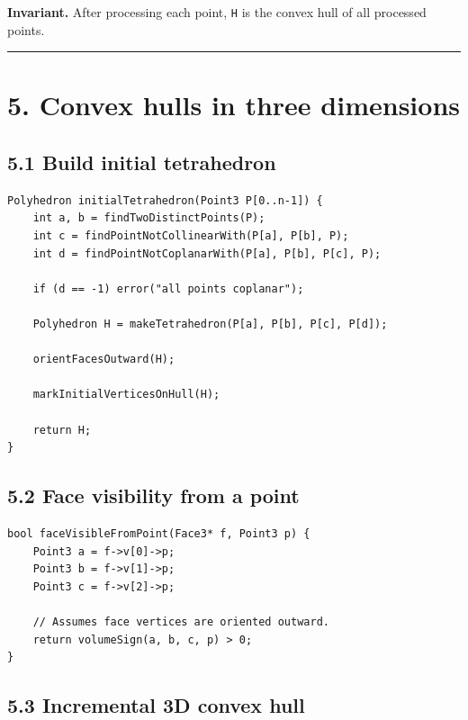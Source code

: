 \documentclass[11pt]{article}
\begin{document}
\textbf{Invariant.} After processing each point,
\texttt{H} is the convex hull of all processed points.

\begin{center}\rule{0.5\linewidth}{0.5pt}\end{center}

\section{5. Convex hulls in three
dimensions}\label{convex-hulls-in-three-dimensions}

\subsection{5.1 Build initial
tetrahedron}\label{build-initial-tetrahedron}

\begin{verbatim}
Polyhedron initialTetrahedron(Point3 P[0..n-1]) {
    int a, b = findTwoDistinctPoints(P);
    int c = findPointNotCollinearWith(P[a], P[b], P);
    int d = findPointNotCoplanarWith(P[a], P[b], P[c], P);

    if (d == -1) error("all points coplanar");

    Polyhedron H = makeTetrahedron(P[a], P[b], P[c], P[d]);

    orientFacesOutward(H);

    markInitialVerticesOnHull(H);

    return H;
}
\end{verbatim}

\subsection{5.2 Face visibility from a
point}\label{face-visibility-from-a-point}

\begin{verbatim}
bool faceVisibleFromPoint(Face3* f, Point3 p) {
    Point3 a = f->v[0]->p;
    Point3 b = f->v[1]->p;
    Point3 c = f->v[2]->p;

    // Assumes face vertices are oriented outward.
    return volumeSign(a, b, c, p) > 0;
}
\end{verbatim}

\subsection{5.3 Incremental 3D convex
hull}\label{incremental-3d-convex-hull}
\end{document}
